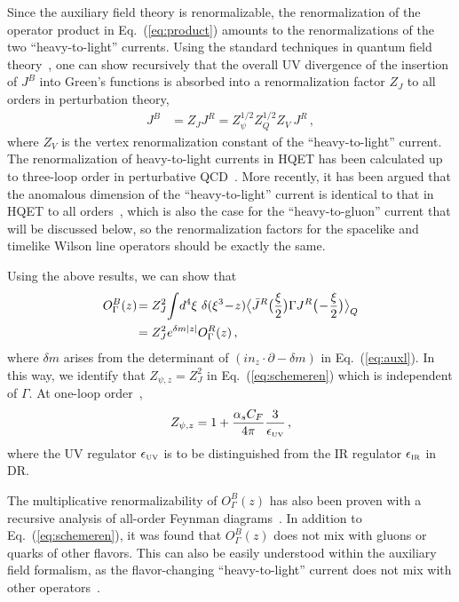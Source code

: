 \documentclass[aps,rmp,reprint,amsmath,amssymb,graphicx,longbibliography]{revtex4-1} %
\newcommand{\beq}{\begin{eqnarray}}
\newcommand{\eeq}{\end{eqnarray}}
\newcommand{\nn}{\nonumber}
\DeclareRobustCommand{\eq}[1]{Eq.~(\ref{eq:#1})}
\begin{document}
Since the auxiliary field theory is renormalizable, the renormalization of the operator product in \eq{product} amounts to the renormalizations of the two ``heavy-to-light'' currents. Using the standard techniques in quantum field theory~\cite{Collins:1984xc}, one can show recursively that the overall UV divergence of the insertion of $J^B$ into Green's functions is absorbed into a renormalization factor $Z_J$ to all orders in perturbation theory,
\begin{align}
	J^B&=Z_{J}J^R = Z_{\psi}^{1/2}Z_{Q}^{1/2}Z_{V}\ J^R\,,
\end{align}
where $Z_{V}$ is the vertex renormalization constant of the ``heavy-to-light'' current.
The renormalization of heavy-to-light currents in HQET has been calculated up to three-loop order in perturbative QCD~\cite{Shifman:1986sm,Politzer:1988wp,Ji:1991pr,Chetyrkin:2003vi,Broadhurst:1991fz}. More recently, it has been argued that the anomalous dimension of the ``heavy-to-light'' current is identical to that in HQET to all orders~\cite{Braun:2020ymy}, which is also the case for the ``heavy-to-gluon'' current that will be discussed below, so the renormalization factors for the spacelike and timelike Wilson line operators should be exactly the same.

Using the above results, we can show that
\begin{align} \label{eq:renproof}
	O^B_\Gamma(z)\!&= Z_J^2\!\int\! d^4\xi\ \delta(\xi^3\!-\!z)\big\langle \bar{J}^R\big({\xi\over2}\big) \Gamma  J^R\big(\!-\!{\xi\over2}\big)\big\rangle_Q\nn\\
	&= Z_J^2 e^{\delta m|z|} O^R_\Gamma(z)\,,
\end{align}
where $\delta m$ arises from the determinant of $(in_z\cdot \partial - \delta m)$ in \eq{auxl}. In this way, we identify that $Z_{\psi,z} =  Z_J^2 $ in \eq{schemeren} which is independent of $\Gamma$. At one-loop order~\cite{Stefanis:1983ke},
\beq \label{eq:zpsiz}
Z_{\psi,z} = 1+ \frac{\alpha_sC_F}{4\pi}{3\over\epsilon_{\mbox{\tiny UV}}}\,,
\eeq
where the UV regulator $\epsilon_{\mbox{\tiny UV}}$ is to be distinguished from the IR regulator $\epsilon_{\mbox{\tiny IR}}$ in DR.

The multiplicative renormalizability of $ O^B_\Gamma(z)$ has also been proven with a recursive analysis of all-order Feynman diagrams~\cite{Ishikawa:2017faj}. In addition to \eq{schemeren}, it was found that $O^B_\Gamma(z)$ does not mix with gluons or quarks of other flavors. This can also be easily understood within the auxiliary field formalism, as the flavor-changing ``heavy-to-light'' current does not mix with other operators~\cite{Green:2020xco}.
\end{document}
